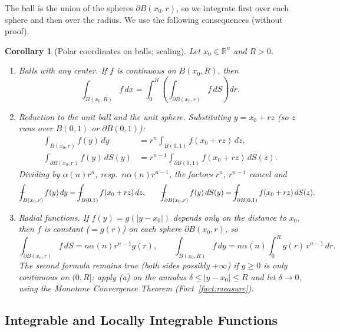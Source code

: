 \documentclass[11pt]{article}
\def\Xint#1{\mathchoice
  {\XXint\displaystyle\textstyle{#1}}%
  {\XXint\textstyle\scriptstyle{#1}}%
  {\XXint\scriptstyle\scriptscriptstyle{#1}}%
  {\XXint\scriptscriptstyle\scriptscriptstyle{#1}}%
  \!\int}
\def\XXint#1#2#3{{\setbox0=\hbox{$#1{#2#3}{\int}$}
  \vcenter{\hbox{$#2#3$}}\kern-.5\wd0}}
\def\fint{\Xint-}
\theoremstyle{plain}
\newtheorem{corollary}[theorem]{Corollary}
\theoremstyle{definition}
\theoremstyle{remark}
\begin{document}
The ball is the union of the spheres $\partial B(x_0, r)$, so we integrate first over each sphere and then over the radius. We use the following consequences (without proof).

\begin{corollary}[Polar coordinates on balls; scaling]\label{cor:polar}
Let $x_0 \in \mathbb{R}^n$ and $R > 0$.
\begin{enumerate}
    \item[(a)] \emph{Balls with any center.} If $f$ is continuous on $B(x_0,R)$, then
    $$ \int_{B(x_0,R)} f\, dx = \int_0^R \left( \int_{\partial B(x_0,r)} f\, dS \right) dr. $$
    \item[(b)] \emph{Reduction to the unit ball and the unit sphere.} Substituting $y = x_0 + r z$ (so $z$ runs over $B(0,1)$ or $\partial B(0,1)$):
\begin{align*}
\int_{B(x_0,r)} f(y)\, dy &= r^n \int_{B(0,1)} f(x_0 + rz)\, dz, \\
\int_{\partial B(x_0,r)} f(y)\, dS(y) &= r^{n-1} \int_{\partial B(0,1)} f(x_0 + rz)\, dS(z).
\end{align*}
    Dividing by $\alpha(n) r^n$, resp.\ $n\alpha(n) r^{n-1}$, the factors $r^n$, $r^{n-1}$ cancel and
    $$ \fint_{B(x_0,r)} f(y)\, dy = \fint_{B(0,1)} f(x_0 + rz)\, dz, \qquad \fint_{\partial B(x_0,r)} f(y)\, dS(y) = \fint_{\partial B(0,1)} f(x_0 + rz)\, dS(z). $$
    \item[(c)] \emph{Radial functions.} If $f(y) = g(|y - x_0|)$ depends only on the distance to $x_0$, then $f$ is constant ($= g(r)$) on each sphere $\partial B(x_0,r)$, so
    $$ \int_{\partial B(x_0, r)} f\, dS = n\alpha(n) r^{n-1} g(r), \qquad \int_{B(x_0,R)} f\, dy = n\alpha(n) \int_0^R g(r)\, r^{n-1}\, dr. $$
    The second formula remains true (both sides possibly $+\infty$) if $g \geq 0$ is only continuous on $(0, R]$: apply (a) on the annulus $\delta \le |y - x_0| \le R$ and let $\delta \to 0$, using the Monotone Convergence Theorem (Fact~\ref{fact:measure}).
\end{enumerate}
\end{corollary}

\subsection{Integrable and Locally Integrable Functions}\label{ssec:integrability}
\end{document}
